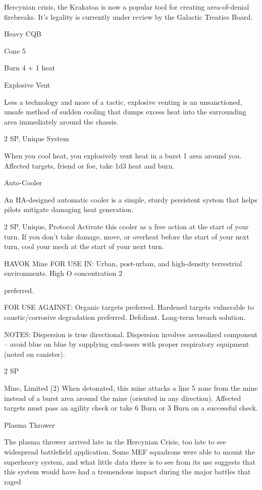 Hercynian crisis, the Krakatoa is now a popular tool for creating area-of-denial firebreaks. It’s legality is
currently under review by the Galactic Treaties Board.

Heavy CQB

Cone 5

Burn 4 + 1 heat


Explosive Vent

Less a technology and more of a tactic, explosive venting is an unsanctioned, unsafe method of sudden
cooling that dumps excess heat into the surrounding area immediately around the chassis.

2 SP, Unique
System




When you cool heat, you explosively vent heat in a burst 1 area around you. Affected targets,
friend or foe, take 1d3 heat and burn.


Auto-Cooler

An HA-designed automatic cooler is a simple, sturdy persistent system that helps pilots mitigate damaging
heat generation.

2 SP, Unique, Protocol
Activate this cooler as a free action at the start of your turn. If you don’t take damage, move, or
overheat before the start of your next turn, cool your mech at the start of your next turn.


HAVOK Mine
FOR USE IN: Urban, post-urban, and high-density terrestrial environments. High O   concentration
                                                                                              2

preferred.

FOR USE AGAINST: Organic targets preferred. Hardened targets vulnerable to caustic/corrosive
degradation preferred. Defoliant. Long-term breach solution.

NOTES: Dispersion is true directional. Dispersion involves aerosolized component -- avoid blue on blue by
supplying end-users with proper respiratory equipment (noted on canister).

2 SP

Mine, Limited (2)
When detonated, this mine attacks a line 5 zone from the mine instead of a burst area around the
mine (oriented in any direction). Affected targets must pass an agility check or take 6 Burn or 3
Burn on a successful check.


Plasma Thrower

The plasma thrower arrived late in the Hercynian Crisis, too late to see widespread battlefield application.
Some MEF squadrons were able to mount the superheavy system, and what little data there is to see from
its use suggests that this system would have had a tremendous impact during the major battles that raged

